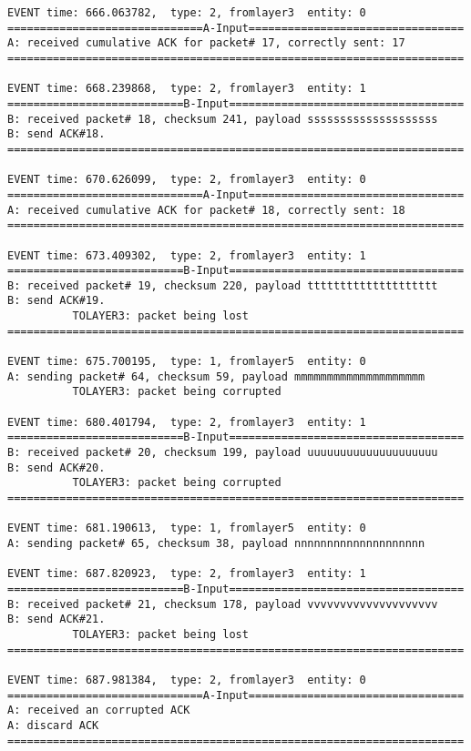 \documentclass[12pt]{article}
\begin{document}
\begin{verbatim}
EVENT time: 666.063782,  type: 2, fromlayer3  entity: 0
==============================A-Input=================================
A: received cumulative ACK for packet# 17, correctly sent: 17
======================================================================

EVENT time: 668.239868,  type: 2, fromlayer3  entity: 1
===========================B-Input====================================
B: received packet# 18, checksum 241, payload ssssssssssssssssssss
B: send ACK#18.
======================================================================

EVENT time: 670.626099,  type: 2, fromlayer3  entity: 0
==============================A-Input=================================
A: received cumulative ACK for packet# 18, correctly sent: 18
======================================================================

EVENT time: 673.409302,  type: 2, fromlayer3  entity: 1
===========================B-Input====================================
B: received packet# 19, checksum 220, payload tttttttttttttttttttt
B: send ACK#19.
          TOLAYER3: packet being lost
======================================================================

EVENT time: 675.700195,  type: 1, fromlayer5  entity: 0
A: sending packet# 64, checksum 59, payload mmmmmmmmmmmmmmmmmmmm
          TOLAYER3: packet being corrupted

EVENT time: 680.401794,  type: 2, fromlayer3  entity: 1
===========================B-Input====================================
B: received packet# 20, checksum 199, payload uuuuuuuuuuuuuuuuuuuu
B: send ACK#20.
          TOLAYER3: packet being corrupted
======================================================================

EVENT time: 681.190613,  type: 1, fromlayer5  entity: 0
A: sending packet# 65, checksum 38, payload nnnnnnnnnnnnnnnnnnnn

EVENT time: 687.820923,  type: 2, fromlayer3  entity: 1
===========================B-Input====================================
B: received packet# 21, checksum 178, payload vvvvvvvvvvvvvvvvvvvv
B: send ACK#21.
          TOLAYER3: packet being lost
======================================================================

EVENT time: 687.981384,  type: 2, fromlayer3  entity: 0
==============================A-Input=================================
A: received an corrupted ACK 
A: discard ACK
======================================================================


\end{verbatim}
\end{document}
